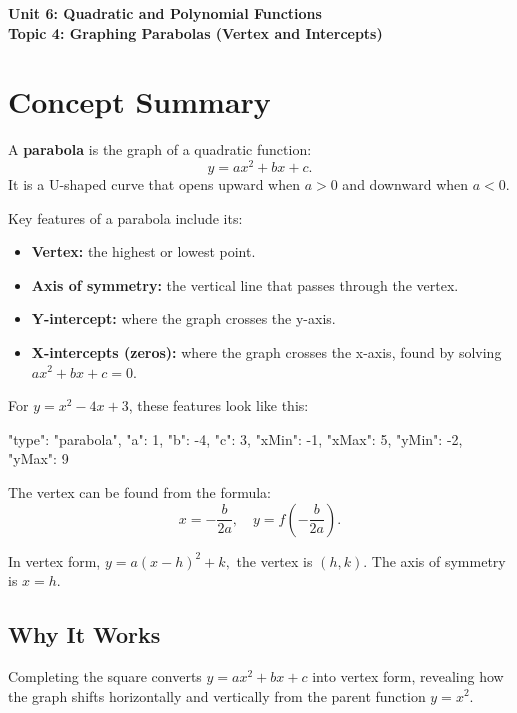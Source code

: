 \documentclass[14pt]{extarticle}
\begin{document}
\raggedright
{}

\begin{center}
    \LARGE \textbf{Unit 6: Quadratic and Polynomial Functions} \\[6pt]
    \Large \textbf{Topic 4: Graphing Parabolas (Vertex and Intercepts)}
\end{center}

\vspace{1em}

\section*{Concept Summary}

A \textbf{parabola} is the graph of a quadratic function:
\[
y = ax^2 + bx + c.
\]
It is a U-shaped curve that opens upward when \(a > 0\) and downward when \(a < 0.\)

Key features of a parabola include its:
\begin{itemize}
  \item \textbf{Vertex:} the highest or lowest point.
  \item \textbf{Axis of symmetry:} the vertical line that passes through the vertex.
  \item \textbf{Y-intercept:} where the graph crosses the y-axis.
  \item \textbf{X-intercepts (zeros):} where the graph crosses the x-axis, found by solving \(ax^2 + bx + c = 0.\)
\end{itemize}

For \(y = x^2 - 4x + 3\), these features look like this:

\begin{diagramdata}
{
  "type": "parabola",
  "a": 1,
  "b": -4,
  "c": 3,
  "xMin": -1,
  "xMax": 5,
  "yMin": -2,
  "yMax": 9
}
\end{diagramdata}

The vertex can be found from the formula:
\[
x = -\frac{b}{2a}, \quad y = f\!\left(-\frac{b}{2a}\right).
\]

In vertex form, \(y = a(x - h)^2 + k,\) the vertex is \((h, k)\).  
The axis of symmetry is \(x = h.\)

\subsection*{Why It Works}
Completing the square converts \(y = ax^2 + bx + c\) into vertex form, revealing how the graph shifts horizontally and vertically from the parent function \(y = x^2.\)
\end{document}
